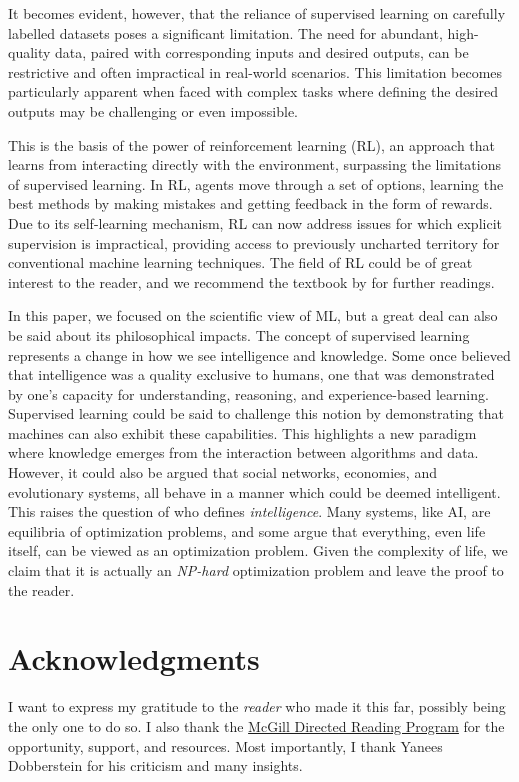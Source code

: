 \documentclass{article}
\begin{document}
It becomes evident, however, that the reliance of supervised learning on carefully labelled datasets poses a significant limitation. The need for abundant, high-quality data, paired with corresponding inputs and desired outputs, can be restrictive and often impractical in real-world scenarios. This limitation becomes particularly apparent when faced with complex tasks where defining the desired outputs may be challenging or even impossible. 

This is the basis of the power of reinforcement learning (RL), an approach that learns from interacting directly with the environment, surpassing the limitations of supervised learning. In RL, agents move through a set of options, learning the best methods by making mistakes and getting feedback in the form of rewards. Due to its self-learning mechanism, RL can now address issues for which explicit supervision is impractical, providing access to previously uncharted territory for conventional machine learning techniques. The field of RL could be of great interest to the reader, and we recommend the textbook by \cite{Sutton1998} for further readings. 

In this paper, we focused on the scientific view of ML, but a great deal can also be said about its philosophical impacts. The concept of supervised learning represents a change in how we see intelligence and knowledge. Some once believed that intelligence was a quality exclusive to humans, one that was demonstrated by one's capacity for understanding, reasoning, and experience-based learning. Supervised learning could be said to challenge this notion by demonstrating that machines can also exhibit these capabilities. This highlights a new paradigm where knowledge emerges from the interaction between algorithms and data. However, it could also be argued that social networks, economies, and evolutionary systems, all behave in a manner which could be deemed intelligent. This raises the question of who defines \textit{intelligence}. Many systems, like AI, are equilibria of optimization problems, and some argue that everything, even life itself, can be viewed as an optimization problem. Given the complexity of life, we claim that it is actually an \textit{NP-hard} optimization problem and leave the proof to the reader. 


\section*{Acknowledgments}
I want to express my gratitude to the \textit{reader} who made it this far, possibly being the only one to do so. I also thank the \href{https://www.math.mcgill.ca/gsams/drp/}{McGill Directed Reading Program} for the opportunity, support, and resources. Most importantly, I thank Yanees Dobberstein for his criticism and many insights.

 {\footnotesize
  
}
% 



%
%
%
\end{document}
